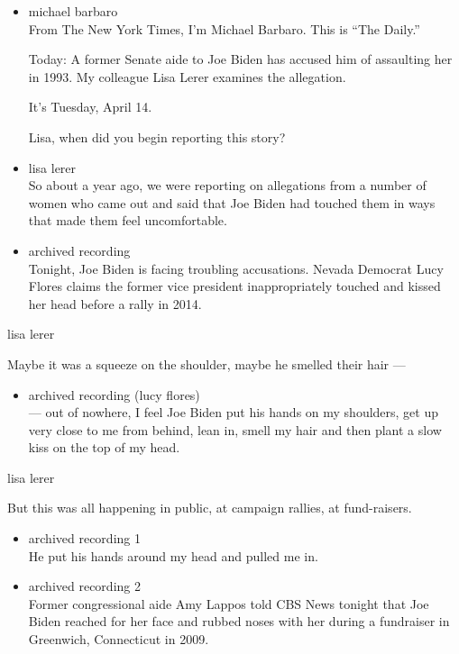 \begin{itemize}
\item
  michael barbaro\\
  From The New York Times, I'm Michael Barbaro. This is ``The Daily.''

  Today: A former Senate aide to Joe Biden has accused him of assaulting
  her in 1993. My colleague Lisa Lerer examines the allegation.

  It's Tuesday, April 14.

  Lisa, when did you begin reporting this story?
\item
  lisa lerer\\
  So about a year ago, we were reporting on allegations from a number of
  women who came out and said that Joe Biden had touched them in ways
  that made them feel uncomfortable.
\item
  archived recording\\
  Tonight, Joe Biden is facing troubling accusations. Nevada Democrat
  Lucy Flores claims the former vice president inappropriately touched
  and kissed her head before a rally in 2014.
\end{itemize}

lisa lerer

Maybe it was a squeeze on the shoulder, maybe he smelled their hair ---

\begin{itemize}
\tightlist
\item
  archived recording (lucy flores)\\
  --- out of nowhere, I feel Joe Biden put his hands on my shoulders,
  get up very close to me from behind, lean in, smell my hair and then
  plant a slow kiss on the top of my head.
\end{itemize}

lisa lerer

But this was all happening in public, at campaign rallies, at
fund-raisers.

\begin{itemize}
\item
  archived recording 1\\
  He put his hands around my head and pulled me in.
\item
  archived recording 2\\
  Former congressional aide Amy Lappos told CBS News tonight that Joe
  Biden reached for her face and rubbed noses with her during a
  fundraiser in Greenwich, Connecticut in 2009.
\end{itemize}

